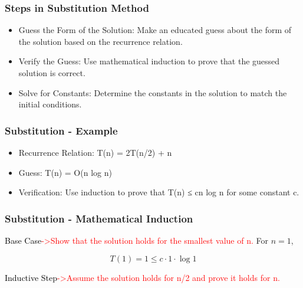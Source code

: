 \begin{frame}
    \frametitle{Steps in Substitution Method}
    \vspace{0.4cm} %
    \begin{itemize}
        \item Guess the Form of the Solution: Make an educated guess about the form of the solution based on the recurrence relation.
        \vspace{0.3cm} %
        \item Verify the Guess: Use mathematical induction to prove that the guessed solution is correct.
        \vspace{0.3cm}
        \item Solve for Constants: Determine the constants in the solution to match the initial conditions.
    \end{itemize}
    
    \vspace{0.5cm} %
\end{frame}



\begin{frame}
    \frametitle{Substitution - Example}
    \vspace{0.4cm} %
    \begin{itemize}
        \item Recurrence Relation: T(n) = 2T(n/2) + n
        \vspace{0.3cm} %
        \item Guess: T(n) = O(n log n)
        \vspace{0.3cm}
        \item Verification: Use induction to prove that T(n) ≤ cn log n for some constant c.
    \end{itemize}
    
    \vspace{0.5cm} %
\end{frame}


\begin{frame}
    \frametitle{Substitution - Mathematical Induction}
    \vspace{0.4cm} %
    \begin{block}{\textcolor{black}{Base Case\textcolor{red}{->Show that the solution holds for the smallest value of n.}}}
For \( n = 1 \), 

\[
T(1) = 1 \leq c \cdot 1 \cdot \log 1
\]

    \end{block}
    \vspace{0.4cm}
    \begin{block}{\textcolor{black}{Inductive Step\textcolor{red}{->Assume the solution holds for n/2 and prove it holds for n.}}}
    \end{block}
    \vspace{0.4cm}
    \vspace{0.5cm} %
\end{frame}


